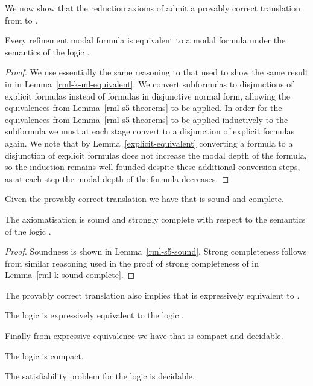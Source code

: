 We now show that the reduction axioms of \logicRmlS{} admit a provably correct translation from \langRml{} to \langMl{}.

\begin{lemma}\label{rml-s5-ml-equivalent}
Every refinement modal formula is equivalent to a modal formula under the semantics of the logic \logicRmlS{}.
\end{lemma}

\begin{proof}
We use essentially the same reasoning to that used to show the same result in \axiomRmlK{} in Lemma~\ref{rml-k-ml-equivalent}.
We convert subformulas to disjunctions of explicit formulas instead of formulas in disjunctive normal form, allowing the equivalences from Lemma~\ref{rml-s5-theorems} to be applied.
In order for the equivalences from Lemma~\ref{rml-s5-theorems} to be applied inductively to the subformula we must at each stage convert to a disjunction of explicit formulas again.
We note that by Lemma~\ref{explicit-equivalent} converting a formula to a disjunction of explicit formulas does not increase the modal depth of the formula, so the induction remains well-founded despite these additional conversion steps, as at each step the modal depth of the formula decreases.
\end{proof}

Given the provably correct translation we have that \axiomRmlS{} is sound and complete.

\begin{theorem}
The axiomatisation \axiomRmlS{} is sound and strongly complete with respect to the semantics of the logic \logicRmlS{}.
\end{theorem}

\begin{proof}
Soundness is shown in Lemma~\ref{rml-s5-sound}.
Strong completeness follows from similar reasoning used in the proof of strong completeness of \logicRmlK{} in Lemma~\ref{rml-k-sound-complete}.
\end{proof}

The provably correct translation also implies that \logicRmlS{} is expressively equivalent to \logicS{}.

\begin{corollary}
The logic \logicRmlS{} is expressively equivalent to the logic \logicS{}.
\end{corollary}

Finally from expressive equivalence we have that \logicRmlS{} is compact and decidable.

\begin{corollary}
The logic \logicRmlS{} is compact.
\end{corollary}

\begin{corollary}
The satisfiability problem for the logic \logicRmlS{} is decidable.
\end{corollary}
